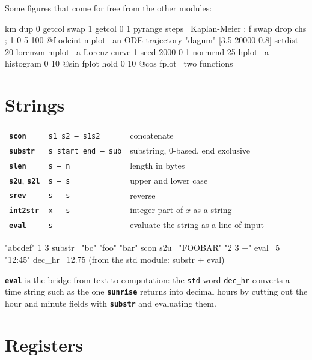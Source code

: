 \documentclass[11pt,letterpaper]{article}
\newcommand{\code}[1]{\texttt{#1}}
\newcommand{\cmd}[1]{\texttt{\textbf{#1}}}
\newcommand{\stk}[1]{\texttt{#1}}
\begin{document}
Some figures that come for free from the other modules:
\begin{rpn}
[2 3 3 5 8 9] [1 1 0 1 1 0] km dup 0 getcol swap 1 getcol 0 1 pyrange steps   \ Kaplan-Meier
: f swap drop chs ; 1 0 5 100 @f odeint mplot                                 \ an ODE trajectory
"dagum" [3.5 20000 0.8] setdist 20 lorenzm mplot                              \ a Lorenz curve
1 seed 2000 0 1 normrnd 25 hplot                                              \ a histogram
0 10 @sin fplot hold 0 10 @cos fplot                                           \ two functions
\end{rpn}

\section{Strings}
\label{sec:strings}

\begin{center}
\begin{tabular}{@{}llp{}@{}}
\toprule
\cmd{scon}    & \stk{s1 s2 -- s1s2} & concatenate \\
\cmd{substr}  & \stk{s start end -- sub} & substring, 0-based, end exclusive \\
\cmd{slen}    & \stk{s -- n}  & length in bytes \\
\cmd{s2u}, \cmd{s2l} & \stk{s -- s} & upper and lower case \\
\cmd{srev}    & \stk{s -- s}  & reverse \\
\cmd{int2str} & \stk{x -- s}  & integer part of $x$ as a string \\
\cmd{eval}    & \stk{s --}    & evaluate the string as a line of input \\
\bottomrule
\end{tabular}
\end{center}
\begin{rpn}
"abcdef" 1 3 substr        \ "bc"
"foo" "bar" scon s2u       \ "FOOBAR"
"2 3 +" eval               \ 5
"12:45" dec_hr             \ 12.75   (from the std module: substr + eval)
\end{rpn}
\cmd{eval} is the bridge from text to computation: the \code{std} word \code{dec\_hr} converts a time string such as the one \cmd{sunrise} returns into decimal hours by cutting out the hour and minute fields with \cmd{substr} and evaluating them.

\section{Registers}
\end{document}
